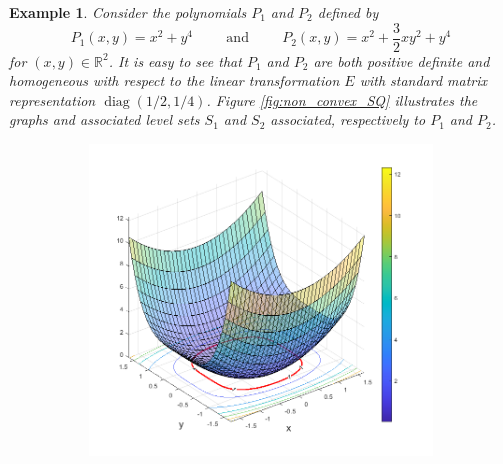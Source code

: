 \documentclass[11pt]{article}
\newtheorem{example}{Example}
\newcommand\diag{\operatorname{diag}}
\newcommand{\f}[2]{\frac{#1}{#2}}
\begin{document}
\begin{example}\label{exp:non_convex}\normalfont
Consider the polynomials $P_1$ and $P_2$ defined by
\begin{equation*}
P_1(x,y)=x^2+y^4\hspace{1cm}\mbox{and}\hspace{1cm}P_2(x,y)=x^2 + \f{3}{2} xy^2 + y^4
\end{equation*}
for $(x,y)\in\mathbb{R}^2$. It is easy to see that $P_1$ and $P_2$ are both positive definite and homogeneous with respect to the linear transformation $E$ with standard matrix representation $\diag(1/2,1/4)$. Figure \ref{fig:non_convex_SQ} illustrates the graphs and associated level sets $S_{1}$ and $S_{2}$ associated, respectively to $P_1$ and $P_2$. 

\begin{figure}[!htb]
    \centering
    \hspace{10pt}
    \begin{subfigure}{0.5\textwidth}
    \centering
    \includegraphics[scale=0.45]{non_convex_SP.png}
    \vspace{-10pt}

\end{subfigure}
\end{figure}
\end{example}
\end{document}
